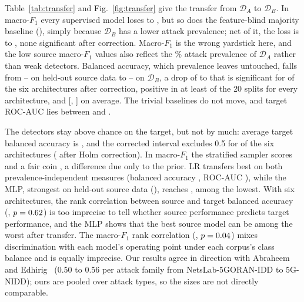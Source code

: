 \documentclass{ieeeaccess}
\newcommand{\DA}{\ensuremath{\mathcal{D}_{A}}}
\newcommand{\DB}{\ensuremath{\mathcal{D}_{B}}}
\begin{document}
Table~\ref{tab:transfer} and Fig.~\ref{fig:transfer} give the transfer from \DA{} to \DB{}. In macro-$F_1$ every supervised model loses \TrFoneDropMin{} to \TrFoneDropMax{}, but so does the feature-blind majority baseline (\TrMajDrop{}), simply because \DB{} has a lower attack prevalence; net of it, the loss is \TrDiDmin{} to \TrDiDmax{}, none significant after correction. Macro-$F_1$ is the wrong yardstick here, and the low source macro-$F_1$ values also reflect the \PrevDa\% attack prevalence of \DA{} rather than weak detectors. Balanced accuracy, which prevalence leaves untouched, falls from \TrSrcBAmin{}--\TrSrcBAmax{} on held-out source data to \TrTgtBAmin{}--\TrTgtBAmax{} on \DB{}, a drop of \TrBAdropMin{} to \TrBAdropMax{} that is significant for \TrSigBA{} of the six architectures after correction, positive in at least \TrBAseedsMin{} of the 20 splits for every architecture, and \TrBAdropAvg{} [\TrBAdropAvgNbLo, \TrBAdropAvgNbHi] on average. The trivial baselines do not move, and target ROC-AUC lies between \TrTgtAUCmin{} and \TrTgtAUCmax{}.

The detectors stay above chance on the target, but not by much: average target balanced accuracy is \TrTgtBAavg{}, and the corrected interval excludes 0.5 for \TrChanceSig{} of the six architectures (\TrChanceSigHolm{} after Holm correction). In macro-$F_1$ the stratified sampler scores \TrStratFloor{} and a fair coin \TrFairCoin{}, a difference due only to the prior. LR transfers best on both prevalence-independent measures (balanced accuracy \TrLRtgtBA{}, ROC-AUC \TrLRtgtAUC{}), while the MLP, strongest on held-out source data (\TrMLPsrcBA{}), reaches \TrMLPtgtBA{}, among the lowest. With six architectures, the rank correlation between source and target balanced accuracy (\RhoBA{}, $p=0.62$) is too imprecise to tell whether source performance predicts target performance, and the MLP shows that the best source model can be among the worst after transfer. The macro-$F_1$ rank correlation (\RhoFone{}, $p=0.04$) mixes discrimination with each model's operating point under each corpus's class balance and is equally imprecise. Our results agree in direction with Abraheem and Edhirig~\cite{abraheem2026bidirectional} (0.50 to 0.56 per attack family from NetsLab-5GORAN-IDD to 5G-NIDD); ours are pooled over attack types, so the sizes are not directly comparable.
\end{document}
